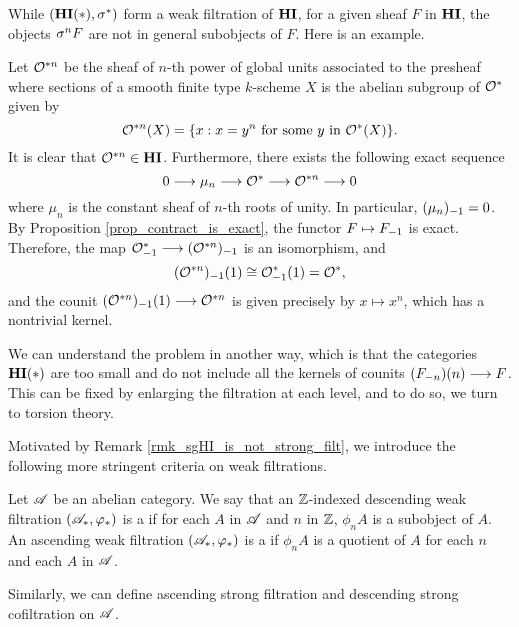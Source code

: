 \begin{rmk}\label{rmk_sgHI_is_not_strong_filt}
While $(\HI(*), \sgHI{*})$ form a weak filtration of $\HI$, for
a given sheaf $F$ in $\HI$, the objects $\sgHI{n} F$ are not 
in general subobjects of $F$. Here is an example.

Let $\Oxn$ be the sheaf of $n$-th power of global units 
associated to the presheaf where sections of a smooth finite type 
$k$-scheme $X$ is the abelian subgroup of $\Ox$ given by 
\[
\Oxn(X) = \{x : x=y^n\textrm{ for some }y \textrm{ in } \Ox(X)\}.
\]
It is clear that $\Oxn \in \HI$. Furthermore, there exists the 
following exact sequence 
\[
0 \to \mu_n \to \Ox \to \Oxn \to 0
\]
where $\mu_n$ is the constant sheaf of $n$-th roots of unity.
In particular, $\RHI{(\mu_n)} = 0$. By Proposition 
\ref{prop_contract_is_exact}, the functor $F \mapsto \RHI{F}$ is
exact. Therefore, the map $\RHI{\Ox} \to \RHI{(\Oxn)}$ is an
isomorphism, and
\[
\LHI{\RHI{(\Oxn)}} \cong \LHI{\RHI{\Ox}} = \Ox,
\]
and the counit $\LHI{\RHI{(\Oxn)}} \to \Oxn$ is given precisely by
$x \mapsto x^n$, which has a nontrivial kernel.

We can understand the problem in another way, which is that the 
categories $\HI(*)$ are too small and do not include all
the kernels of counits $\LHI[n]{(\RHI[n]{F})} \to F$. This can be 
fixed by enlarging the filtration at each level, and to do so, we 
turn to torsion theory.
\end{rmk}

Motivated by Remark \ref{rmk_sgHI_is_not_strong_filt}, we 
introduce the following more stringent criteria on weak
filtrations.

\begin{defn}\label{def_strong_filtration}
Let $\Cat{A}$ be an abelian category. We say that an $\Z$-indexed 
descending weak filtration $(\Cat{A}_*, \phi_*)$ is a  if for each $A$ in $\Cat{A}$ and $n$ in $\Z$, 
$\phi_n A$ is a subobject of $A$. An ascending weak filtration 
$(\Cat{A}_*, \phi_*)$ is a  if $\phi_n A$ 
is a quotient of $A$ for each $n$ and each $A$ in $\Cat{A}$.

Similarly, we can define ascending strong filtration and descending
strong cofiltration on $\Cat{A}$.
\end{defn}

